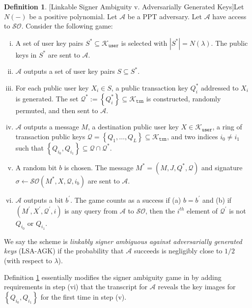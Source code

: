 \documentclass{mrl}
\theoremstyle{definition}
\newtheorem{defn}[theorem]{Definition}
\begin{document}
\begin{defn}{[Linkable Signer Ambiguity v. Adversarially Generated Keys]}\label{def:ambig} Let $N(-)$ be a positive polynomial. Let $\mathcal{A}$ be a PPT adversary. Let $\mathcal{A}$ have access to $\mathcal{SO}$. Consider the following game:
\begin{enumerate}[(i)]

\item A set of user key pairs $S^* \subseteq \mathcal{K}_{\texttt{user}}$ is selected with $\left|S^*\right| = N(\lambda)$. The public keys in $S^*$ are sent to $\mathcal{A}$.

\item $\mathcal{A}$ outputs a set of user key pairs $S \subseteq S^*$.

\item For each public user key $X_i \in S$, a public transaction key $Q^*_i$ addressed to $X_i$ is generated. The set $\mathcal{Q}^* := \left\{Q^*_i\right\} \subseteq \mathcal{K}_{\texttt{txn}}$ is constructed, randomly permuted, and then sent to $\mathcal{A}$.

\item $\mathcal{A}$ outputs a message $M$, a destination public user key $X \in \mathcal{K}_{\texttt{user}}$, a ring of transaction public keys $\mathcal{Q}=\left\{Q_1, \ldots, Q_L\right\} \subseteq \mathcal{K}_{\texttt{txn}}$, and two indices $i_0 \neq i_1$ such that $\left\{Q_{i_0}, Q_{i_1}\right\} \subseteq \mathcal{Q} \cap \mathcal{Q}^*$.

\item A random bit $b$ is chosen. The message $M^*=(M,J,Q^*,\mathcal{Q})$ and signature $\sigma \leftarrow \mathcal{SO}(M^*,X,\mathcal{Q},i_b)$ are sent to $\mathcal{A}$.

\item $\mathcal{A}$ outputs a bit $b^{\prime}$. The game counts as a success if (a) $b = b^{\prime}$ and (b) if $(M^{\prime},X^{\prime},\mathcal{Q}^{\prime},i)$ is any query from $\mathcal{A}$ to $\mathcal{SO}$, then the $i^{th}$ element of $\mathcal{Q}^{\prime}$ is not $Q_{i_0}$ or $Q_{i_1}$.

\end{enumerate}
We say the scheme is \textit{linkably signer ambiguous against adversarially generated keys} (LSA-AGK) if the probability that $\mathcal{A}$ succeeds is negligibly close to $1/2$ (with respect to $\lambda$).
\end{defn}

Definition \ref{def:ambig} essentially modifies the signer ambiguity game in \cite{bender2006ring} by adding requirements in step (vi) that the transcript for $\mathcal{A}$ reveals the key images for $\left\{Q_{i_0}, Q_{i_1}\right\}$ for the first time in step (v).
\end{document}
